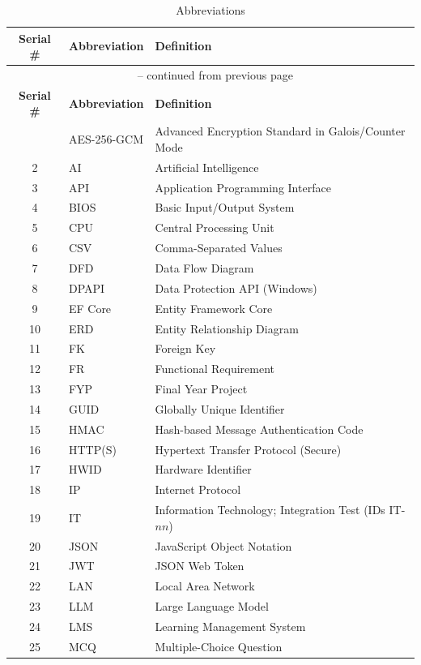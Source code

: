 \begin{longtable}{cl>{\raggedright\arraybackslash}p{9.6cm}}
\caption{Abbreviations}
\label{tab:Abbreviations}\\
\hline\hline
\textbf{Serial \#} & \textbf{Abbreviation} & \textbf{Definition} \\
\hline
\endfirsthead
\multicolumn{3}{c}{\tablename~\thetable{} -- continued from previous page}\\
\hline\hline
\textbf{Serial \#} & \textbf{Abbreviation} & \textbf{Definition} \\
\hline
\endhead
\hline
\endfoot
\hline\hline
\endlastfoot
1 & AES-256-GCM & Advanced Encryption Standard in Galois/Counter Mode \\
2 & AI & Artificial Intelligence \\
3 & API & Application Programming Interface \\
4 & BIOS & Basic Input/Output System \\
5 & CPU & Central Processing Unit \\
6 & CSV & Comma-Separated Values \\
7 & DFD & Data Flow Diagram \\
8 & DPAPI & Data Protection API (Windows) \\
9 & EF Core & Entity Framework Core \\
10 & ERD & Entity Relationship Diagram \\
11 & FK & Foreign Key \\
12 & FR & Functional Requirement \\
13 & FYP & Final Year Project \\
14 & GUID & Globally Unique Identifier \\
15 & HMAC & Hash-based Message Authentication Code \\
16 & HTTP(S) & Hypertext Transfer Protocol (Secure) \\
17 & HWID & Hardware Identifier \\
18 & IP & Internet Protocol \\
19 & IT & Information Technology; Integration Test (IDs IT-$nn$) \\
20 & JSON & JavaScript Object Notation \\
21 & JWT & JSON Web Token \\
22 & LAN & Local Area Network \\
23 & LLM & Large Language Model \\
24 & LMS & Learning Management System \\
25 & MCQ & Multiple-Choice Question \\

\end{longtable}
